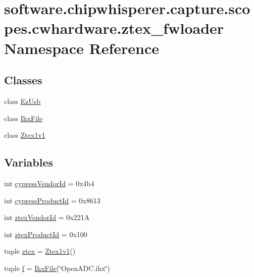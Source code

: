 \hypertarget{namespacesoftware_1_1chipwhisperer_1_1capture_1_1scopes_1_1cwhardware_1_1ztex__fwloader}{}\section{software.\+chipwhisperer.\+capture.\+scopes.\+cwhardware.\+ztex\+\_\+fwloader Namespace Reference}
\label{namespacesoftware_1_1chipwhisperer_1_1capture_1_1scopes_1_1cwhardware_1_1ztex__fwloader}
\subsection*{Classes}
\begin{DoxyCompactItemize}
\item 
class \hyperlink{classsoftware_1_1chipwhisperer_1_1capture_1_1scopes_1_1cwhardware_1_1ztex__fwloader_1_1EzUsb}{Ez\+Usb}
\item 
class \hyperlink{classsoftware_1_1chipwhisperer_1_1capture_1_1scopes_1_1cwhardware_1_1ztex__fwloader_1_1IhxFile}{Ihx\+File}
\item 
class \hyperlink{classsoftware_1_1chipwhisperer_1_1capture_1_1scopes_1_1cwhardware_1_1ztex__fwloader_1_1Ztex1v1}{Ztex1v1}
\end{DoxyCompactItemize}
\subsection*{Variables}
\begin{DoxyCompactItemize}
\item 
int \hyperlink{namespacesoftware_1_1chipwhisperer_1_1capture_1_1scopes_1_1cwhardware_1_1ztex__fwloader_a837b69cc42ef5c9a7ea9a3a35e8d046a}{cypress\+Vendor\+Id} = 0x4b4
\item 
int \hyperlink{namespacesoftware_1_1chipwhisperer_1_1capture_1_1scopes_1_1cwhardware_1_1ztex__fwloader_a1f58ab76b4ed4215d0a04b68eafc0ae9}{cypress\+Product\+Id} = 0x8613
\item 
int \hyperlink{namespacesoftware_1_1chipwhisperer_1_1capture_1_1scopes_1_1cwhardware_1_1ztex__fwloader_a00d9864865923c039174394302a9adb0}{ztex\+Vendor\+Id} = 0x221\+A
\item 
int \hyperlink{namespacesoftware_1_1chipwhisperer_1_1capture_1_1scopes_1_1cwhardware_1_1ztex__fwloader_a38d15306288ed5ced61f575e51a1591d}{ztex\+Product\+Id} = 0x100
\item 
tuple \hyperlink{namespacesoftware_1_1chipwhisperer_1_1capture_1_1scopes_1_1cwhardware_1_1ztex__fwloader_a683aecc41f879132491dfdf4ef4171d6}{ztex} = \hyperlink{classsoftware_1_1chipwhisperer_1_1capture_1_1scopes_1_1cwhardware_1_1ztex__fwloader_1_1Ztex1v1}{Ztex1v1}()
\item 
tuple \hyperlink{namespacesoftware_1_1chipwhisperer_1_1capture_1_1scopes_1_1cwhardware_1_1ztex__fwloader_af17fcbbbd46d3867eb6b04deb3e7e7b3}{f} = \hyperlink{classsoftware_1_1chipwhisperer_1_1capture_1_1scopes_1_1cwhardware_1_1ztex__fwloader_1_1IhxFile}{Ihx\+File}(\char`\"{}Open\+A\+D\+C.\+ihx\char`\"{})
\end{DoxyCompactItemize}


